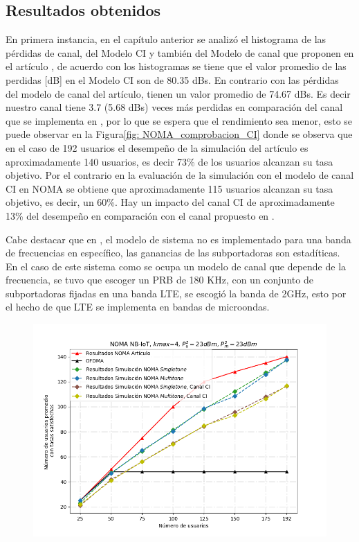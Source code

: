 \subsection{Resultados obtenidos}
En primera instancia, en el capítulo anterior se analizó el histograma de las pérdidas de canal, del Modelo CI y también del Modelo de canal que proponen en el artículo \parencite{Shahini2019} , de acuerdo con los histogramas se tiene que el valor promedio de las perdidas [dB] en el Modelo CI son de 80.35 dBs. En contrario con las pérdidas del modelo de canal del artículo, tienen un valor promedio de 74.67 dBs. Es decir nuestro canal tiene 3.7 (5.68 dBs) veces más perdidas en comparación del canal que se implementa en \parencite{Shahini2019}, por lo que se espera que el rendimiento sea menor, esto se puede observar en la Figura\ref{fig: NOMA_comprobacion_CI} donde se observa que en el caso de 192 usuarios el desempeño de la simulación del artículo es aproximadamente 140 usuarios, es decir 73\% de los usuarios alcanzan su tasa objetivo. Por el contrario en la evaluación de la simulación con el modelo de canal CI en NOMA se obtiene que aproximadamente 115 usuarios alcanzan su tasa objetivo, es decir, un 60\%. Hay un impacto del canal CI de aproximadamente 13\% del desempeño en comparación con el canal propuesto en \parencite{Shahini2019}.\newline

Cabe destacar que en \parencite{Shahini2019}, el modelo de sistema no es implementado para una banda de frecuencias en específico, las ganancias de las subportadoras son estadíticas. En el caso de este sistema como se ocupa un modelo de canal que depende de la frecuencia, se tuvo que escoger un PRB de 180 KHz, con un conjunto de subportadoras fijadas en una banda LTE, se escogió la banda de 2GHz, esto por el hecho de que LTE se implementa en bandas de microondas. \newline


\begin{figure}[th]
    \centering
    \includegraphics[scale=.7]{Figures/ResultadosNOMA/NOMA_comprobacion_CI.png}
    \decoRule
    \caption[]{}
    \label{fig:NOMA_comprobacion_CI}
\end{figure}

